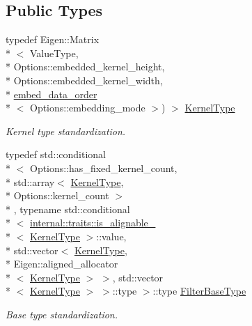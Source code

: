 \subsection*{Public Types}
\begin{DoxyCompactItemize}
\item 
typedef Eigen\-::\-Matrix\\*
$<$ Value\-Type, \\*
Options\-::embedded\-\_\-kernel\-\_\-height, \\*
Options\-::embedded\-\_\-kernel\-\_\-width, \\*
\hyperlink{namespaceffnn_1_1layer_1_1convolution_a88d0a4ec4a7dbc89c35ce95d859a78cf}{embed\-\_\-data\-\_\-order}\\*
$<$ Options\-::embedding\-\_\-mode $>$) $>$ \hyperlink{structffnn_1_1layer_1_1convolution_1_1filter_1_1extrinsics_a0b687a9387270004cdaa00c19bef26da}{Kernel\-Type}
\begin{DoxyCompactList}\small\item\em Kernel type standardization. \end{DoxyCompactList}\item 
typedef std\-::conditional\\*
$<$ Options\-::has\-\_\-fixed\-\_\-kernel\-\_\-count, \\*
std\-::array$<$ \hyperlink{structffnn_1_1layer_1_1convolution_1_1filter_1_1extrinsics_a0b687a9387270004cdaa00c19bef26da}{Kernel\-Type}, \\*
Options\-::kernel\-\_\-count $>$\\*
, typename std\-::conditional\\*
$<$ \hyperlink{structffnn_1_1internal_1_1traits_1_1is__alignable__128}{internal\-::traits\-::is\-\_\-alignable\-\_}\\*
$<$ \hyperlink{structffnn_1_1layer_1_1convolution_1_1filter_1_1extrinsics_a0b687a9387270004cdaa00c19bef26da}{Kernel\-Type} $>$\-::value, \\*
std\-::vector$<$ \hyperlink{structffnn_1_1layer_1_1convolution_1_1filter_1_1extrinsics_a0b687a9387270004cdaa00c19bef26da}{Kernel\-Type}, \\*
Eigen\-::aligned\-\_\-allocator\\*
$<$ \hyperlink{structffnn_1_1layer_1_1convolution_1_1filter_1_1extrinsics_a0b687a9387270004cdaa00c19bef26da}{Kernel\-Type} $>$ $>$, std\-::vector\\*
$<$ \hyperlink{structffnn_1_1layer_1_1convolution_1_1filter_1_1extrinsics_a0b687a9387270004cdaa00c19bef26da}{Kernel\-Type} $>$ $>$\-::type $>$\-::type \hyperlink{structffnn_1_1layer_1_1convolution_1_1filter_1_1extrinsics_aa033ddfd5dc48de1253f1071211990e3}{Filter\-Base\-Type}
\begin{DoxyCompactList}\small\item\em Base type standardization. \end{DoxyCompactList}\end{DoxyCompactItemize}


